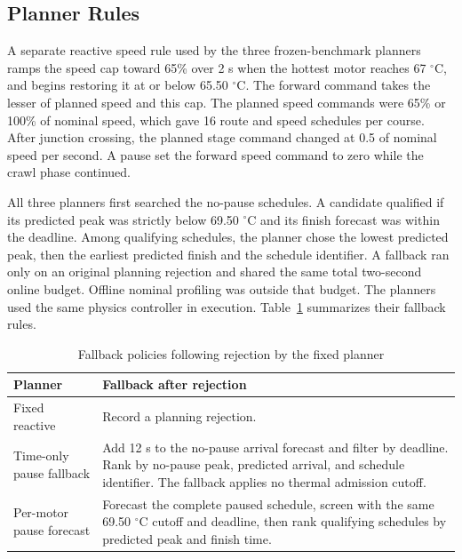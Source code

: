 \documentclass{ieeeaccess}
\begin{document}
\subsection{Planner Rules}

A separate reactive speed rule used by the three frozen-benchmark planners ramps the speed cap toward 65\% over 2 s when the hottest motor reaches 67 \ensuremath{{}^{\circ}\mathrm{C}}, and begins restoring it at or below 65.50 \ensuremath{{}^{\circ}\mathrm{C}}. The forward command takes the lesser of planned speed and this cap. The planned speed commands were 65\% or 100\% of nominal speed, which gave 16 route and speed schedules per course. After junction crossing, the planned stage command changed at 0.5 of nominal speed per second. A pause set the forward speed command to zero while the crawl phase continued.

All three planners first searched the no-pause schedules. A candidate qualified if its predicted peak was strictly below 69.50 \ensuremath{{}^{\circ}\mathrm{C}} and its finish forecast was within the deadline. Among qualifying schedules, the planner chose the lowest predicted peak, then the earliest predicted finish and the schedule identifier. A fallback ran only on an original planning rejection and shared the same total two-second online budget. Offline nominal profiling was outside that budget. The planners used the same physics controller in execution. Table~\ref{tab:methods} summarizes their fallback rules.

\begin{table}[!t]
\caption{Fallback policies following rejection by the fixed planner}
\label{tab:methods}
\centering
\footnotesize
\setlength{\tabcolsep}{4pt}
\renewcommand{\arraystretch}{1.18}
\begin{tabularx}{\columnwidth}{@{}>{\raggedright\arraybackslash}p{}>{\raggedright\arraybackslash}X@{}}
\hline
Planner & Fallback after rejection \\
\hline
Fixed reactive & Record a planning rejection. \\
Time-only pause fallback & Add 12 s to the no-pause arrival forecast and filter by deadline. Rank by no-pause peak, predicted arrival, and schedule identifier. The fallback applies no thermal admission cutoff. \\
Per-motor pause forecast & Forecast the complete paused schedule, screen with the same 69.50 \ensuremath{{}^{\circ}\mathrm{C}} cutoff and deadline, then rank qualifying schedules by predicted peak and finish time. \\
\hline
\end{tabularx}
\end{table}
\end{document}
